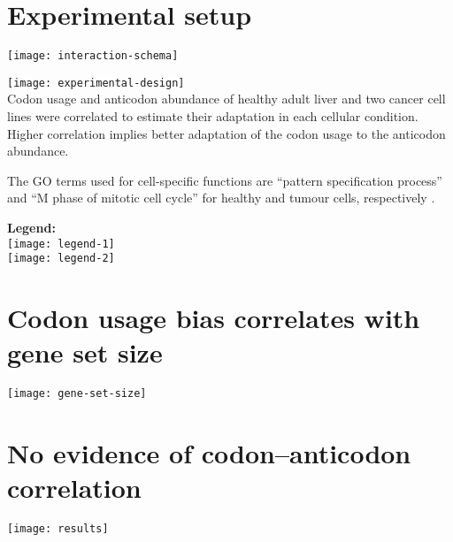 \documentclass[a0,portrait]{a0poster}
\begin{document}
\section*{Experimental setup}
\vspace{-0.5cm}
\begin{minipage}{0.15\textwidth}
    \centering
    \texttt{[image: interaction-schema]}
\end{minipage}%
\hfill
\begin{minipage}[t][][t]{0.50\textwidth}
    \texttt{[image: experimental-design]}
    \\[0.5cm]
    Codon usage and anticodon abundance of healthy adult liver and two
    cancer cell lines were correlated to estimate their adaptation in each
    cellular condition. Higher correlation implies better adaptation of the
    codon usage to the anticodon abundance.

    The GO terms used for cell-specific functions are “pattern specification
    process” and “M phase of mitotic cell cycle” for healthy and tumour
    cells, respectively \citep{Gingold:2014}.
\end{minipage}%
\hfill
\begin{minipage}{0.23\textwidth}
    \centering
    \textbf{Legend:}\\[0.5cm]
    \texttt{[image: legend-1]}
    \\[2cm]
    \texttt{[image: legend-2]}
\end{minipage}%

\vspace{1cm}
\noindent
\begin{minipage}[t][][t]{0.48\textwidth}
    \section*{Codon usage bias correlates with gene set size}
    \texttt{[image: gene-set-size]}
\end{minipage}%
\hfill
\begin{minipage}[t][][t]{0.48\textwidth}
    \section*{No evidence of codon--anticodon correlation}
    \texttt{[image: results]}
\end{minipage}%

\vspace{-0.5cm}
\end{document}

